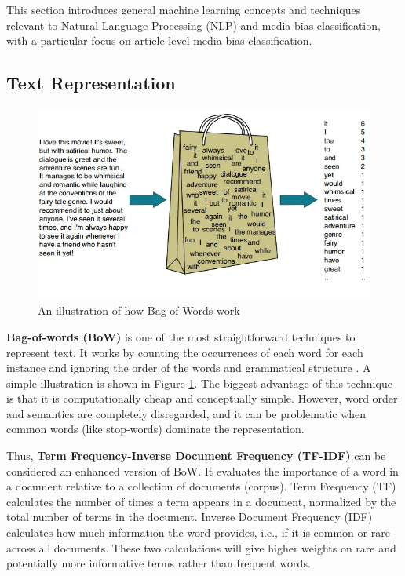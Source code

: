 This section introduces general machine learning concepts and techniques relevant to Natural Language Processing (NLP) and media bias classification, with a particular focus on article-level media bias classification.

\subsection{Text Representation}

\begin{figure}[htbp]
    \centering
    \includegraphics[width=0.7\linewidth]{images/bow_illustration.png}
    \caption{An illustration of how Bag-of-Words work \cite{rahul-2023-bow-medium}}
    \label{fig:bow_illustration}
\end{figure}

\textbf{Bag-of-words (BoW)} is one of the most straightforward techniques to represent text. It works by counting the occurrences of each word for each instance and ignoring the order of the words and grammatical structure \cite{qader-2019-bow}. A simple illustration is shown in Figure \ref{fig:bow_illustration}. The biggest advantage of this technique is that it is computationally cheap and conceptually simple. However, word order and semantics are completely disregarded, and it can be problematic when common words (like stop-words) dominate the representation. 

Thus, \textbf{Term Frequency-Inverse Document Frequency (TF-IDF)} can be considered an enhanced version of BoW. It evaluates the importance of a word in a document relative to a collection of documents (corpus). Term Frequency (TF) calculates the number of times a term appears in a document, normalized by the total number of terms in the document. Inverse Document Frequency (IDF) calculates how much information the word provides, i.e., if it is common or rare across all documents. These two calculations will give higher weights on rare and potentially more informative terms rather than frequent words.

